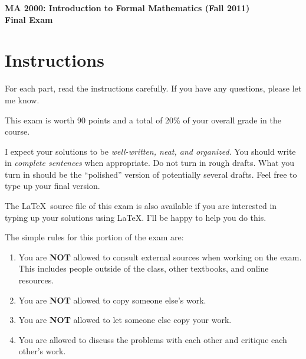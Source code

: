 \documentclass[11pt]{article}
\theoremstyle{definition}
\begin{document}
\begin{center}

{\Large\bf MA 2000: Introduction to Formal Mathematics (Fall 2011)}\\
\smallskip
{\Large\bf Final Exam}


\bigskip

  
  \bigskip
  


\end{center}

\section*{Instructions}

For each part, read the instructions carefully.  If you have any questions, please let me know.

\bigskip

This exam is worth 90 points and a total of 20\% of your overall grade in the course.

\bigskip

I expect your solutions to be \emph{well-written, neat, and organized}.  You should write in \emph{complete sentences} when appropriate.  Do not turn in rough drafts.  What you turn in should be the ``polished'' version of potentially several drafts.  Feel free to type up your final version.  

\bigskip

The \LaTeX\ source file of this exam is also available if you are interested in typing up your solutions using \LaTeX.  I'll be happy to help you do this.

\bigskip

The simple rules for this portion of the exam are:

\begin{enumerate}
\item You are \textbf{NOT} allowed to consult external sources when working on the exam.  This includes people outside of the class, other textbooks, and online resources.
\item You are \textbf{NOT} allowed to copy someone else's work.
\item You are \textbf{NOT} allowed to let someone else copy your work.
\item You are allowed to discuss the problems with each other and critique each other's work.
\end{enumerate}
\end{document}
